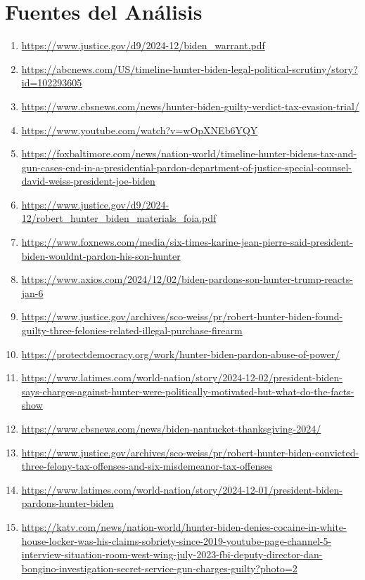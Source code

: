 \documentclass[10pt,a4paper]{article}
\begin{document}
\section*{Fuentes del Análisis}
    \begin{enumerate}[leftmargin=*]
            \item \url{ https://www.justice.gov/d9/2024-12/biden\_warrant.pdf }
            \item \url{ https://abcnews.com/US/timeline-hunter-biden-legal-political-scrutiny/story?id=102293605 }
            \item \url{ https://www.cbsnews.com/news/hunter-biden-guilty-verdict-tax-evasion-trial/ }
            \item \url{ https://www.youtube.com/watch?v=wOpXNEb6YQY }
            \item \url{ https://foxbaltimore.com/news/nation-world/timeline-hunter-bidens-tax-and-gun-cases-end-in-a-presidential-pardon-department-of-justice-special-counsel-david-weiss-president-joe-biden }
            \item \url{ https://www.justice.gov/d9/2024-12/robert\_hunter\_biden\_materials\_foia.pdf }
            \item \url{ https://www.foxnews.com/media/six-times-karine-jean-pierre-said-president-biden-wouldnt-pardon-his-son-hunter }
            \item \url{ https://www.axios.com/2024/12/02/biden-pardons-son-hunter-trump-reacts-jan-6 }
            \item \url{ https://www.justice.gov/archives/sco-weiss/pr/robert-hunter-biden-found-guilty-three-felonies-related-illegal-purchase-firearm }
            \item \url{ https://protectdemocracy.org/work/hunter-biden-pardon-abuse-of-power/ }
            \item \url{ https://www.latimes.com/world-nation/story/2024-12-02/president-biden-says-charges-against-hunter-were-politically-motivated-but-what-do-the-facts-show }
            \item \url{ https://www.cbsnews.com/news/biden-nantucket-thanksgiving-2024/ }
            \item \url{ https://www.justice.gov/archives/sco-weiss/pr/robert-hunter-biden-convicted-three-felony-tax-offenses-and-six-misdemeanor-tax-offenses }
            \item \url{ https://www.latimes.com/world-nation/story/2024-12-01/president-biden-pardons-hunter-biden }
            \item \url{ https://katv.com/news/nation-world/hunter-biden-denies-cocaine-in-white-house-locker-was-his-claims-sobriety-since-2019-youtube-page-channel-5-interview-situation-room-west-wing-july-2023-fbi-deputy-director-dan-bongino-investigation-secret-service-gun-charges-guilty?photo=2 }

\end{enumerate}
\end{document}
